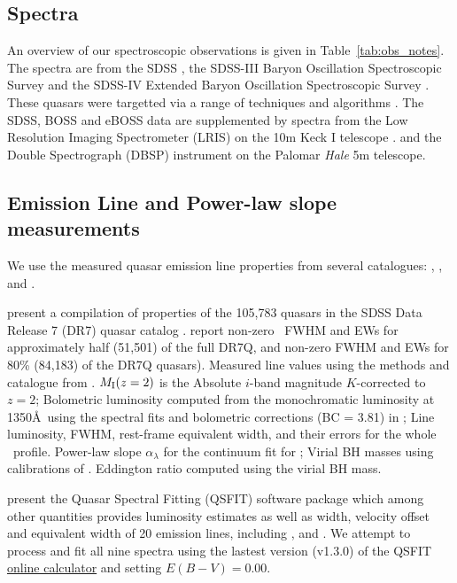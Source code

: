 \documentclass[a4paper,fleqn,usenatbib]{mnras}
\begin{document}
\subsection{Spectra}
An overview of our spectroscopic observations is given in
Table~\ref{tab:obs_notes}.  The spectra are from the SDSS
\citep{Stoughton2002, DR7, Schneider2010}, the SDSS-III Baryon
Oscillation Spectroscopic Survey \citep[BOSS][]{Eisenstein2011,
Dawson2013, Smee2013, Alam2015, Paris2017} and the SDSS-IV Extended
Baryon Oscillation Spectroscopic Survey \citep[eBOSS; ][]{Dawson2016,
Abolfathi2018, Paris2018}.  These quasars were targetted via a range
of techniques and algorithms \citep[see ][]{Richards2002, Ross2012,
Myers2015}. The SDSS, BOSS and eBOSS data are supplemented by
spectra from the Low Resolution Imaging Spectrometer (LRIS) on the 10m
Keck {\sc I} telescope \citep{Oke1995}.  and the Double Spectrograph
(DBSP) instrument on the Palomar {\it Hale} 5m telescope.


\subsection{Emission Line and Power-law slope measurements}
We use the measured quasar emission line properties from several catalogues: 
\citet{Shen2011}, \citet{Hamann2017}, \citet{Kozlowski2017} and
\citet{Calderone2017}.

\citet{Shen2011} present a compilation of properties of the 105,783
quasars in the SDSS Data Release 7 (DR7) quasar catalog \citep[DR7Q;
][]{Schneider2007}. \citet{Shen2011} report non-zero \civ\ FWHM and
EWs for approximately half (51,501) of the full DR7Q, and non-zero
\mgii FWHM and EWs for 80\% (84,183) of the DR7Q quasars).
Measured line values using the methods and catalogue from
\citet{Shen2011}.  $M_{\rm I}(z=2)$ is the Absolute $i$-band magnitude
$K$-corrected to $z = 2$; Bolometric luminosity computed from the
monochromatic luminosity at 1350\AA\ using the spectral fits and
bolometric corrections (BC = 3.81) in \citet{Richards2006b}; Line
luminosity, FWHM, rest-frame equivalent width, and their errors for
the whole \civ\ profile.  Power-law slope $\alpha_{\lambda}$ for the
continuum fit for \civ; Virial BH masses using calibrations of
\citet{VestergaardPeterson2006}.  Eddington ratio computed using the
virial BH mass.


\citet{Calderone2017} present the Quasar Spectral Fitting (QSFIT)
software package which among other quantities provides luminosity
estimates as well as width, velocity offset and equivalent width of 20
emission lines, including \civ, \ciii and \mgii.  We attempt to process and fit
all nine spectra using the lastest version (v1.3.0) of the QSFIT
\href{https://qsfit.inaf.it/cat_1.30/onlinefit.php}{online calculator}
and setting $E(B-V)=0.00$.
\end{document}
